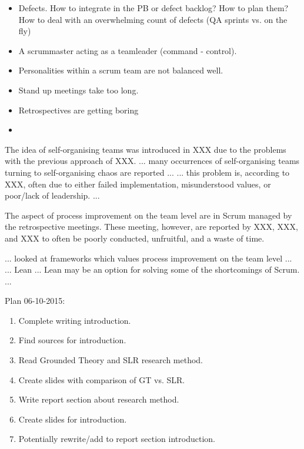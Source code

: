 \begin{itemize}
	\item Defects. How to integrate in the PB or defect backlog? How to plan them? How to deal with an overwhelming count of defects (QA sprints vs. on the fly)
	\item  A scrummaster acting as a teamleader (command - control).
	\item Personalities within a scrum team are not balanced well.
	\item Stand up meetings take too long.
	\item Retrospectives are getting boring
	\item 
\end{itemize}
 
 
 
 
 
 
 
 
The idea of self-organising teams was introduced in XXX due to the problems with the previous approach of XXX.
... many occurrences of self-organising teams turning to self-organising chaos are reported ...
... this problem is, according to XXX, often due to either failed implementation, misunderstood values, or poor/lack of leadership. ...

The aspect of process improvement on the team level are in Scrum managed by the retrospective meetings. These meeting, however, are reported by XXX, XXX, and XXX to often be poorly conducted, unfruitful, and a waste of time. 

... looked at frameworks which values process improvement on the team level ...
... Lean ... Lean may be an option for solving some of the shortcomings of Scrum. ...



Plan 06-10-2015:
\begin{enumerate}
	\item Complete writing introduction.
	\item Find sources for introduction.
	
	\item Read Grounded Theory and SLR research method.
	\item Create slides with comparison of GT vs. SLR.
	
	\item Write report section about research method.
	
	\item Create slides for introduction.
	\item Potentially rewrite/add to report section introduction.
\end{enumerate}
